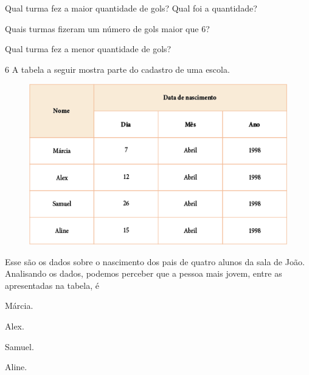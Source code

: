 \begin{escolha}
\item
  Qual turma fez a maior quantidade de gols? Qual foi a quantidade?


\item
  Quais turmas fizeram um número de gols maior que 6?


\item
  Qual turma fez a menor quantidade de gols?

\end{escolha}

\pagebreak
\num{6} A tabela a seguir mostra parte do cadastro de uma escola.

\begin{figure}[htpb!]
\centering
\includegraphics[width=\textwidth]{media/image45.png}
\end{figure}

Esse são os dados sobre o nascimento dos pais de quatro alunos da sala
de João. Analisando os dados, podemos perceber que a pessoa mais jovem,
entre as apresentadas na tabela, é

\begin{escolha}
\item
  Márcia.
\item
  Alex.
\item
  Samuel.
\item
  Aline.
\end{escolha}

